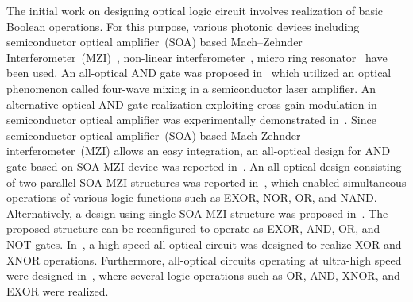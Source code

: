 \documentclass[10pt,letterpaper,twoside,openright]{book}
\begin{document}
The initial work on designing optical logic circuit involves realization of basic Boolean operations. For this purpose, various photonic devices including semiconductor optical amplifier~(SOA) based Mach–Zehnder Interferometer~(MZI)~\cite{Scaffardi2008}, non-linear interferometer~\cite{Zoiros2008}, micro ring resonator~\cite{Xu:07} have been used. An all-optical AND gate was proposed in~\cite{Nesset1995896} which utilized an optical phenomenon called four-wave mixing in a semiconductor laser amplifier. An alternative optical AND gate realization exploiting cross-gain modulation in semiconductor optical amplifier was experimentally demonstrated in~\cite{Kim2004608}. Since semiconductor optical amplifier~(SOA) based Mach-Zehnder interferometer~(MZI) allows an easy integration, an all-optical design for AND gate based on SOA-MZI device was reported in~\cite{dong200680gb}. An all-optical design consisting of two parallel SOA-MZI structures was reported in~\cite{Kim:06}, which enabled simultaneous operations of various logic functions such as EXOR, NOR, OR, and NAND. Alternatively, a design using single SOA-MZI structure was proposed in~\cite{Martinez2007}. The proposed structure can be reconfigured to operate as EXOR, AND, OR, and NOT gates. In~\cite{kang2009all}, a high-speed all-optical circuit was designed to realize XOR and XNOR operations. Furthermore, all-optical circuits operating at ultra-high speed were designed in~\cite{singh2012ultrahigh}, where several logic operations such as OR, AND, XNOR, and EXOR  were realized.     
\end{document}
